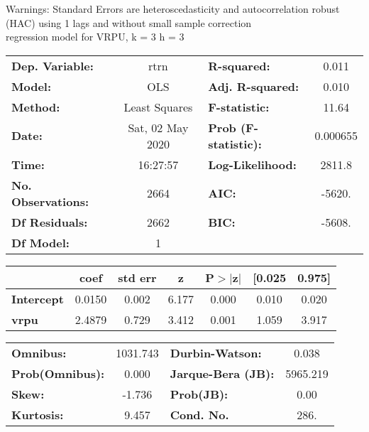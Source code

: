 Warnings: \newline
 [1] Standard Errors are heteroscedasticity and autocorrelation robust (HAC) using 1 lags and without small sample correction\\ 

regression model for VRPU, k = 3 h = 3\begin{center}
\begin{tabular}{lclc}
\toprule
\textbf{Dep. Variable:}    &       rtrn       & \textbf{  R-squared:         } &     0.011   \\
\textbf{Model:}            &       OLS        & \textbf{  Adj. R-squared:    } &     0.010   \\
\textbf{Method:}           &  Least Squares   & \textbf{  F-statistic:       } &     11.64   \\
\textbf{Date:}             & Sat, 02 May 2020 & \textbf{  Prob (F-statistic):} &  0.000655   \\
\textbf{Time:}             &     16:27:57     & \textbf{  Log-Likelihood:    } &    2811.8   \\
\textbf{No. Observations:} &        2664      & \textbf{  AIC:               } &    -5620.   \\
\textbf{Df Residuals:}     &        2662      & \textbf{  BIC:               } &    -5608.   \\
\textbf{Df Model:}         &           1      & \textbf{                     } &             \\
\bottomrule
\end{tabular}
\begin{tabular}{lcccccc}
                   & \textbf{coef} & \textbf{std err} & \textbf{z} & \textbf{P$> |$z$|$} & \textbf{[0.025} & \textbf{0.975]}  \\
\midrule
\textbf{Intercept} &       0.0150  &        0.002     &     6.177  &         0.000        &        0.010    &        0.020     \\
\textbf{vrpu}      &       2.4879  &        0.729     &     3.412  &         0.001        &        1.059    &        3.917     \\
\bottomrule
\end{tabular}
\begin{tabular}{lclc}
\textbf{Omnibus:}       & 1031.743 & \textbf{  Durbin-Watson:     } &    0.038  \\
\textbf{Prob(Omnibus):} &   0.000  & \textbf{  Jarque-Bera (JB):  } & 5965.219  \\
\textbf{Skew:}          &  -1.736  & \textbf{  Prob(JB):          } &     0.00  \\
\textbf{Kurtosis:}      &   9.457  & \textbf{  Cond. No.          } &     286.  \\
\bottomrule
\end{tabular}
\end{center}

